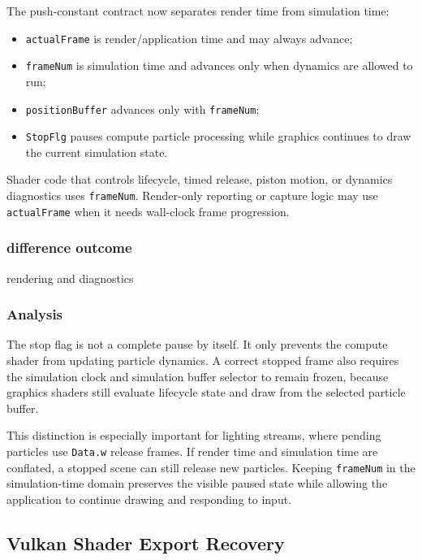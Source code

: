 The push-constant contract now separates render time from simulation time:
\begin{itemize}
    \item \texttt{actualFrame} is render/application time and may always
          advance;
    \item \texttt{frameNum} is simulation time and advances only when dynamics
          are allowed to run;
    \item \texttt{positionBuffer} advances only with \texttt{frameNum};
    \item \texttt{StopFlg} pauses compute particle processing while graphics
          continues to draw the current simulation state.
\end{itemize}

Shader code that controls lifecycle, timed release, piston motion, or
dynamics diagnostics uses \texttt{frameNum}.  Render-only reporting or capture
logic may use \texttt{actualFrame} when it needs wall-clock frame progression.

\subsubsection{difference outcome}

rendering and diagnostics

\subsubsection{Analysis}

The stop flag is not a complete pause by itself.  It only prevents the compute
shader from updating particle dynamics.  A correct stopped frame also requires
the simulation clock and simulation buffer selector to remain frozen, because
graphics shaders still evaluate lifecycle state and draw from the selected
particle buffer.

This distinction is especially important for lighting streams, where pending
particles use \texttt{Data.w} release frames.  If render time and simulation
time are conflated, a stopped scene can still release new particles.  Keeping
\texttt{frameNum} in the simulation-time domain preserves the visible paused
state while allowing the application to continue drawing and responding to
input.

\subsection{Vulkan Shader Export Recovery}

